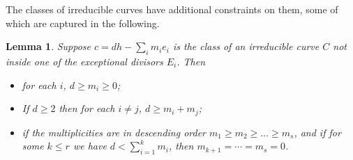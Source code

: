 \documentclass[12pt]{article}
\newtheorem{lemma}[equation]{Lemma}
\numberwithin{equation}{section}
\numberwithin{subeq}{equation}
\def\calO{\mathcal{O}}
\begin{document}

The classes of irreducible curves have additional constraints on them,
some of which are captured in the following.

\begin{lemma}\label{irreducible}
Suppose $c=dh-\sum_i m_i e_{i}$ is the class of an irreducible curve $C$
not inside one of the exceptional divisors $E_i$.  Then
\begin{itemize}
\item[(a)] for each $i$, $d \geq m_i \geq 0$;
\item[(b)] If $d \geq 2$ then for each $i\neq j$, $d \geq m_i + m_j$;
\item[(c)] if the multiplicities are in descending order $m_1 \geq m_2 \geq \ldots \geq m_s$,
and if for some $k \leq r$ we have $d < \sum_{i=1}^k m_i$,
then $m_{k+1}=\cdots=m_s = 0$.
\end{itemize}
\end{lemma}
\end{document}
